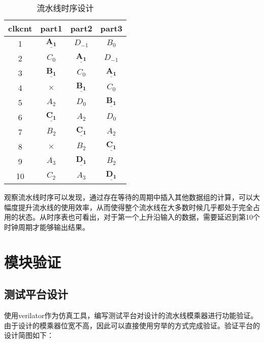 \documentclass[UTF8]{ctexart}
\begin{document}
	\begin{table}[h!]
		\begin{center}
			\caption{流水线时序设计}
			\setlength{\tabcolsep}{8pt}
			\begin{tabular}{c c c c}
\toprule
		\textbf{clkcnt}&\textbf{part1} & \textbf{part2} & \textbf{part3} \\
		\midrule
		1&$\underline{\bm{A_1}}$   &$D_{-1}$ & $B_0$ \\
		2&$C_0$   & $\underline{\bm{A_1}}$& $D_{-1}$\\
		3&$\underline{\bm{B_1}}$   & $C_0$&$\underline{\bm{A_1}}$\\
		4&$\times$   & $\underline{\bm{B_1}}$&$C_0$\\
		5&$A_2$   & $D_0$&$\underline{\bm{B_1}}$\\
		6&$\underline{\bm{C_1}}$   & $A_2$&$D_0$\\
		7&$B_2$   & $\underline{\bm{C_1}}$&$A_2$\\
		8&$\times$ & $B_2$&$\underline{\bm{C_1}}$\\
		9&$A_3$   & $\underline{\bm{D_1}}$&$B_2$\\
		10&$C_2$   & $A_3$&$\underline{\bm{D_1}}$\\
		\bottomrule
			\end{tabular}
		\end{center}
	\end{table}
	\par 观察流水线时序可以发现，通过存在等待的周期中插入其他数据组的计算，可以大幅度提升流水线的使用效率，从而使得整个流水线在大多数时候几乎都处于完全占用的状态。从时序表也可看出，对于第一个上升沿输入的数据，需要延迟到第10个时钟周期才能够输出结果。
	\section{模块验证}
	\subsection{测试平台设计}
	使用verilator作为仿真工具，编写测试平台对设计的流水线模乘器进行功能验证。由于设计的模乘器位宽不高，因此可以直接使用穷举的方式完成验证。验证平台的设计简图如下：
\end{document}
